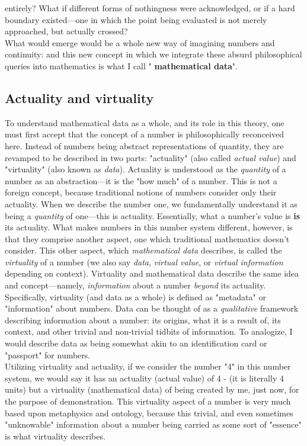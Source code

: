 \documentclass{article}
\begin{document}
entirely? What if different forms of nothingness were acknowledged, or if a hard boundary existed—one in which the point being evaluated is not merely approached, but actually crossed? \\ What would emerge would be a whole new way of imagining numbers and continuity: and this new concept in which we integrate these absurd philosophical queries into mathematics is what I call " \textbf{mathematical data}".\\ \subsection{Actuality and virtuality}To understand mathematical data as a whole, and its role in this theory, one must first accept that the concept of a number is philosophically reconceived here. Instead of numbers being abstract representations of quantity, they are revamped to be described in two parts: "actuality" (also called \textit{actual value}) and "virtuality" (also known as \textit{data}).
Actuality is understood as the \textit{quantity} of a number as an abstraction—it is the "how much" of a number. This is not a foreign concept, because traditional notions of numbers consider only their actuality. When we describe the number one, we fundamentally understand it as being a \textit{quantity} of one—this is actuality. Essentially, what a number's value is \textbf{is} its actuality.
What makes numbers in this number system different, however, is that they comprise another aspect, one which traditional mathematics doesn't consider. This other aspect, which \textit{mathematical data} describes, is called the \textit{virtuality} of a number (we also say \textit{data}, \textit{virtual value}, or \textit{virtual information} depending on context). Virtuality and mathematical data describe the same idea and concept—namely, \textit{information} about a number \textit{beyond} its actuality. Specifically, virtuality (and data as a whole) is defined as "metadata" or "information" about numbers. Data can be thought of as a \textit{qualitative} framework describing information about a number: its origins, what it is a result of, its context, and other trivial and non-trivial tidbits of information. To analogize, I would describe data as being somewhat akin to an identification card or "passport" for numbers.\\ Utilizing virtuality and actuality, if we consider  the number "4" in this number system, we would say it has an actuality (actual value) of 4 - (it is literally 4 units) but a virtuality (mathematical data) of being created by me, just now, for the purpose of demonstration. This virtuality aspect of a number is very much based upon metaphysics and ontology, because this trivial, and even sometimes "unknowable" information about a number being carried as some sort of "essence" is what virtuality describes.\\
\end{document}
